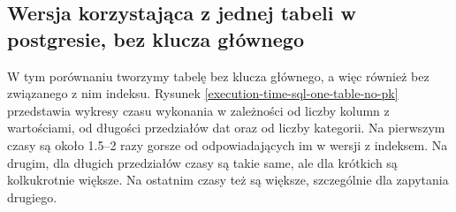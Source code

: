 \documentclass[a4paper,11pt]{article}
\begin{document}
\subsection{Wersja korzystająca z jednej tabeli w postgresie, bez klucza głównego}

W tym porównaniu tworzymy tabelę bez klucza głównego, a więc również bez związanego z nim indeksu.
Rysunek \ref{execution-time-sql-one-table-no-pk} przedstawia wykresy czasu wykonania w zależności
od liczby kolumn z wartościami, od długości przedziałów dat oraz od liczby kategorii.
Na pierwszym czasy są około 1.5--2 razy gorsze od odpowiadających im w wersji z indeksem.
Na drugim, dla długich przedziałów czasy są takie same, ale dla krótkich są kolkukrotnie większe.
Na ostatnim czasy też są większe, szczególnie dla zapytania drugiego.
\end{document}
